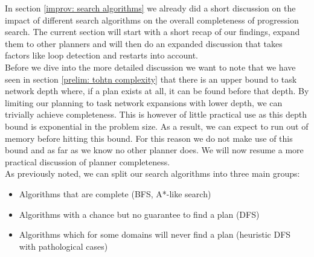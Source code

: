 In section \ref{improv: search algorithms} we already did a short discussion on the impact of different search algorithms on the overall completeness of progression search. The current section will start with a short recap of our findings, expand them to other planners and will then do an expanded discussion that takes factors like loop detection and restarts into account. \\
Before we dive into the more detailed discussion we want to note that we have seen in section \ref{prelim: tohtn complexity} that there is an upper bound to task network depth where, if a plan exists at all, it can be found before that depth. By limiting our planning to task network expansions with lower depth, we can trivially achieve completeness. This is however of little practical use as this depth bound is exponential in the problem size. As a result, we can expect to run out of memory before hitting this bound. For this reason we do not make use of this bound and as far as we know no other planner does. We will now resume a more practical discussion of planner completeness.\\ 
As previously noted, we can split our search algorithms into three main groups:
\begin{itemize}
	\item Algorithms that are complete (BFS, A*-like search)
	\item Algorithms with a chance but no guarantee to find a plan (DFS)
	\item Algorithms which for some domains will never find a plan (heuristic DFS with pathological cases)
\end{itemize}
